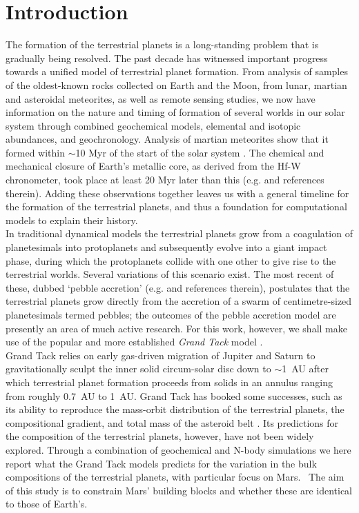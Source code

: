 \documentclass[preprint,5p,times,authoryear]{elsarticle}
\begin{document}
\section{Introduction}
\label{sec:int}
The formation of the terrestrial planets is a long-standing problem that is gradually being resolved. The past decade has witnessed 
important progress towards a unified model of terrestrial planet formation. From analysis of samples of the oldest-known rocks 
collected on Earth and the Moon, from lunar, martian and asteroidal meteorites, as well as remote sensing studies, we now have 
information on the nature and timing of formation of several worlds in our solar system through combined geochemical models, elemental 
and isotopic abundances, and geochronology. Analysis of martian meteorites show that it formed within $\sim$10 Myr of the start of the 
solar system \citep{D11}. The chemical and mechanical closure of Earth’s metallic core, as derived from the Hf-W chronometer, took 
place at least 20 Myr later than this (e.g. \citet{K09} and references therein). Adding these observations together leaves us with a 
general timeline for the formation of the terrestrial planets, and thus a foundation for computational models to explain their 
history.\\

In traditional dynamical models the terrestrial planets grow from a coagulation of planetesimals into protoplanets and subsequently 
evolve into a giant impact phase, during which the protoplanets collide with one other to give rise to the terrestrial worlds. 
Several variations of this scenario exist. {The most recent of these, dubbed `pebble accretion' (e.g. \citet{L15} and references 
therein), postulates that the terrestrial planets grow directly from the accretion of a swarm of centimetre-sized planetesimals termed 
pebbles; the outcomes of the pebble accretion model are presently an area of much active research. For this work, however, we shall 
make use of the popular and more established} {\it Grand Tack} model \citep{W11}.\\

Grand Tack relies on early gas-driven migration of Jupiter and Saturn to gravitationally sculpt the inner solid circum-solar disc 
down to $\sim$1~AU after which terrestrial planet formation proceeds from solids in an annulus ranging from roughly 0.7~AU to 1~AU. 
Grand Tack has booked some successes, such as its ability to reproduce the mass-orbit distribution of the terrestrial planets, the 
compositional gradient, and total mass of the asteroid belt \citep{W11}. Its predictions for the composition of the terrestrial 
planets, however, have not been widely explored. Through a combination of geochemical and N-body simulations we here report what the 
Grand Tack models predicts for the variation in the bulk compositions of the terrestrial planets, with particular focus on Mars. {\ 
The aim of this study is to constrain Mars' building blocks and whether these are identical to those of Earth's.}
\end{document}
